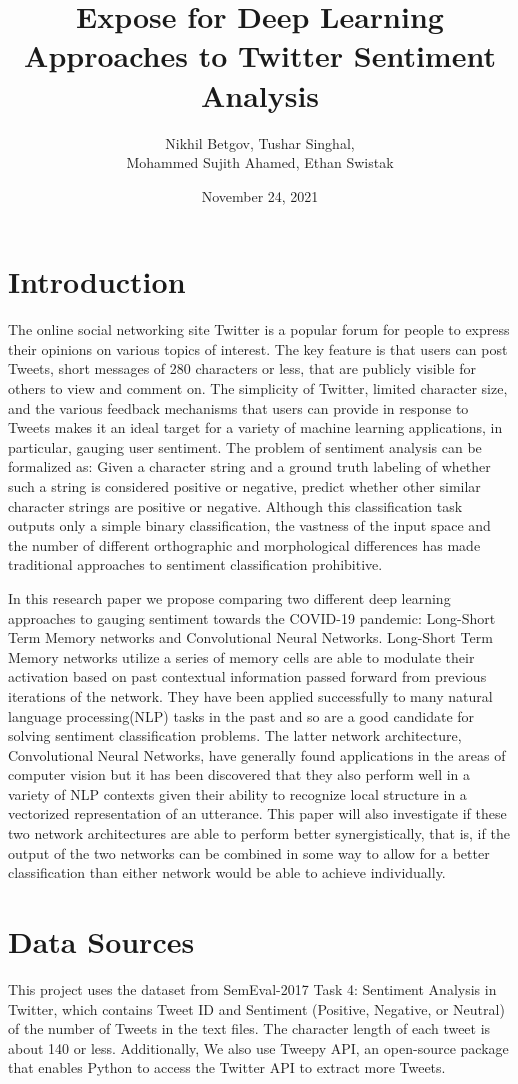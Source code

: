 \documentclass{article}
\title{Expose for Deep Learning Approaches to Twitter Sentiment Analysis}
\author{Nikhil Betgov, Tushar Singhal,\\ Mohammed Sujith Ahamed, Ethan Swistak}
\date{November 24, 2021}
\begin{document}
\maketitle

\section{Introduction}
The online social networking site Twitter is a popular forum for people to express their opinions on various topics of interest. The key feature is that users can post Tweets, short messages of 280 characters or less, that are publicly visible for others to view and comment on. The simplicity of Twitter, limited character size, and the various feedback mechanisms that users can provide in response to Tweets makes it an ideal target for a variety of machine learning applications, in particular, gauging user sentiment. The problem of sentiment analysis can be formalized as: Given a character string and a ground truth labeling of whether such a string is considered positive or negative, predict whether other similar character strings are positive or negative. Although this classification task outputs only a simple binary classification, the vastness of the input space and the number of different orthographic and morphological differences  has made traditional approaches to sentiment classification prohibitive. 

In this research paper we propose comparing two different deep learning approaches to gauging sentiment towards the COVID-19 pandemic: Long-Short Term Memory networks and Convolutional Neural Networks. Long-Short Term Memory networks utilize a series of memory cells are able to modulate their activation based on past contextual information passed forward from previous iterations of the network. They have been applied successfully to many natural language processing(NLP) tasks in the past and so are a good candidate for solving sentiment classification problems. The latter network architecture, Convolutional Neural Networks, have generally found applications in the areas of computer vision but it has been discovered that they also perform well in a variety of NLP contexts given their ability to recognize local structure in a vectorized representation of an utterance. This paper will also investigate if these two network architectures are able to perform better synergistically, that is, if the output of the two networks can be combined in some way to allow for a better classification than either network would be able to achieve individually.


\section{Data Sources}
This project uses the dataset from SemEval-2017 Task 4: Sentiment Analysis in Twitter, which contains Tweet ID and Sentiment (Positive, Negative, or Neutral) of the number of Tweets in the text files.
The character length of each tweet is about 140 or less. Additionally, We also use Tweepy API, an open-source package that enables Python to access the Twitter API to extract more Tweets. 
\end{document}

